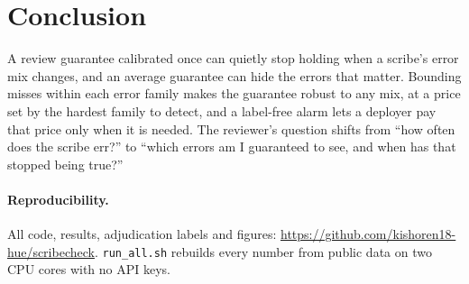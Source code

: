 \documentclass[10pt,twocolumn]{article}
\begin{document}
\section{Conclusion}
A review guarantee calibrated once can quietly stop holding when a scribe's error mix changes, and an average guarantee can hide the errors that matter. Bounding misses within each error family makes the guarantee robust to any mix, at a price set by the hardest family to detect, and a label-free alarm lets a deployer pay that price only when it is needed. The reviewer's question shifts from ``how often does the scribe err?'' to ``which errors am I guaranteed to see, and when has that stopped being true?''

\paragraph{Reproducibility.} All code, results, adjudication labels and figures: \url{https://github.com/kishoren18-hue/scribecheck}. \texttt{run\_all.sh} rebuilds every number from public data on two CPU cores with no API keys.

{\small


}
\end{document}
